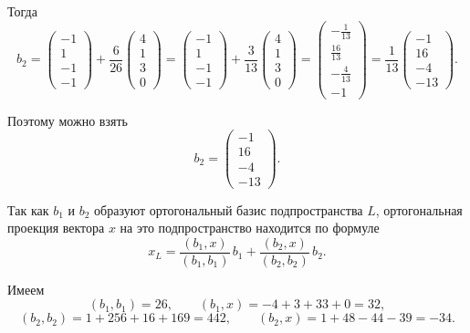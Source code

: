 Тогда
\[
b_2=
\begin{pmatrix}
-1\\
1\\
-1\\
-1
\end{pmatrix}
+\frac{6}{26}
\begin{pmatrix}
4\\
1\\
3\\
0
\end{pmatrix}
=
\begin{pmatrix}
-1\\
1\\
-1\\
-1
\end{pmatrix}
+\frac{3}{13}
\begin{pmatrix}
4\\
1\\
3\\
0
\end{pmatrix}
=
\begin{pmatrix}
-\frac{1}{13}\\
\frac{16}{13}\\
-\frac{4}{13}\\
-1
\end{pmatrix}
=
\frac{1}{13}
\begin{pmatrix}
-1\\
16\\
-4\\
-13
\end{pmatrix}.
\]

Поэтому можно взять
\[
b_2=
\begin{pmatrix}
-1\\
16\\
-4\\
-13
\end{pmatrix}.
\]

Так как $b_1$ и $b_2$ образуют ортогональный базис подпространства $L$, ортогональная проекция вектора $x$ на это подпространство находится по формуле
\[
x_L=
\frac{(b_1,x)}{(b_1,b_1)}\,b_1+
\frac{(b_2,x)}{(b_2,b_2)}\,b_2.
\]

Имеем
\[
(b_1,b_1)=26,\qquad (b_1,x)=-4+3+33+0=32,
\]
\[
(b_2,b_2)=1+256+16+169=442,\qquad (b_2,x)=1+48-44-39=-34.
\]

